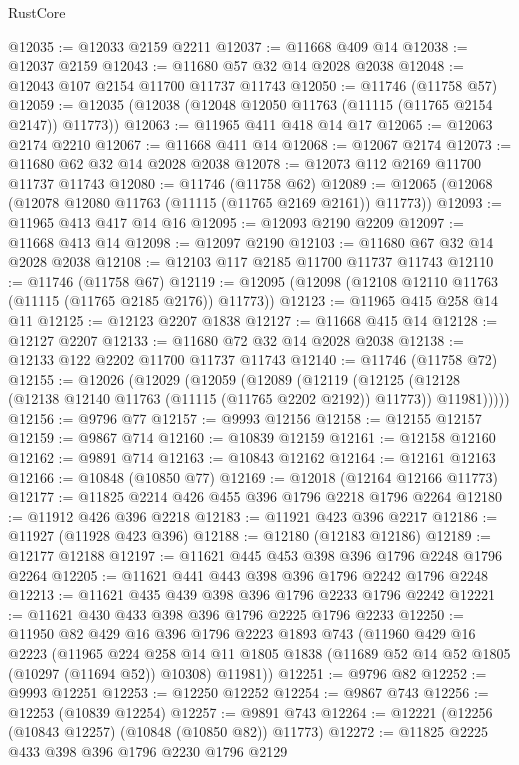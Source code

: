 \begin{lexlean}{RustCore}
\begin{coremodule}
@12035 := @12033 @2159 @2211
@12037 := @11668 @409 @14
@12038 := @12037 @2159
@12043 := @11680 @57 @32 @14 @2028 @2038
@12048 := @12043 @107 @2154 @11700 @11737 @11743
@12050 := @11746 (@11758 @57)
@12059 := @12035 (@12038 (@12048 @12050 @11763 (@11115 (@11765 @2154 @2147)) @11773))
@12063 := @11965 @411 @418 @14 @17
@12065 := @12063 @2174 @2210
@12067 := @11668 @411 @14
@12068 := @12067 @2174
@12073 := @11680 @62 @32 @14 @2028 @2038
@12078 := @12073 @112 @2169 @11700 @11737 @11743
@12080 := @11746 (@11758 @62)
@12089 := @12065 (@12068 (@12078 @12080 @11763 (@11115 (@11765 @2169 @2161)) @11773))
@12093 := @11965 @413 @417 @14 @16
@12095 := @12093 @2190 @2209
@12097 := @11668 @413 @14
@12098 := @12097 @2190
@12103 := @11680 @67 @32 @14 @2028 @2038
@12108 := @12103 @117 @2185 @11700 @11737 @11743
@12110 := @11746 (@11758 @67)
@12119 := @12095 (@12098 (@12108 @12110 @11763 (@11115 (@11765 @2185 @2176)) @11773))
@12123 := @11965 @415 @258 @14 @11
@12125 := @12123 @2207 @1838
@12127 := @11668 @415 @14
@12128 := @12127 @2207
@12133 := @11680 @72 @32 @14 @2028 @2038
@12138 := @12133 @122 @2202 @11700 @11737 @11743
@12140 := @11746 (@11758 @72)
@12155 := @12026
    (@12029
      (@12059
        (@12089
          (@12119
            (@12125 (@12128 (@12138 @12140 @11763 (@11115 (@11765 @2202 @2192)) @11773)) @11981)))))
@12156 := @9796 @77
@12157 := @9993 @12156
@12158 := @12155 @12157
@12159 := @9867 @714
@12160 := @10839 @12159
@12161 := @12158 @12160
@12162 := @9891 @714
@12163 := @10843 @12162
@12164 := @12161 @12163
@12166 := @10848 (@10850 @77)
@12169 := @12018 (@12164 @12166 @11773)
@12177 := @11825 @2214 @426 @455 @396 @1796 @2218 @1796 @2264
@12180 := @11912 @426 @396 @2218
@12183 := @11921 @423 @396 @2217
@12186 := @11927 (@11928 @423 @396)
@12188 := @12180 (@12183 @12186)
@12189 := @12177 @12188
@12197 := @11621 @445 @453 @398 @396 @1796 @2248 @1796 @2264
@12205 := @11621 @441 @443 @398 @396 @1796 @2242 @1796 @2248
@12213 := @11621 @435 @439 @398 @396 @1796 @2233 @1796 @2242
@12221 := @11621 @430 @433 @398 @396 @1796 @2225 @1796 @2233
@12250 := @11950
    @82
    @429
    @16
    @396
    @1796
    @2223
    @1893
    @743
    (@11960
      @429
      @16
      @2223
      (@11965
        @224
        @258
        @14
        @11
        @1805
        @1838
        (@11689 @52 @14 @52 @1805 (@10297 (@11694 @52)) @10308)
        @11981))
@12251 := @9796 @82
@12252 := @9993 @12251
@12253 := @12250 @12252
@12254 := @9867 @743
@12256 := @12253 (@10839 @12254)
@12257 := @9891 @743
@12264 := @12221 (@12256 (@10843 @12257) (@10848 (@10850 @82)) @11773)
@12272 := @11825 @2225 @433 @398 @396 @1796 @2230 @1796 @2129

\end{coremodule}
\end{lexlean}
